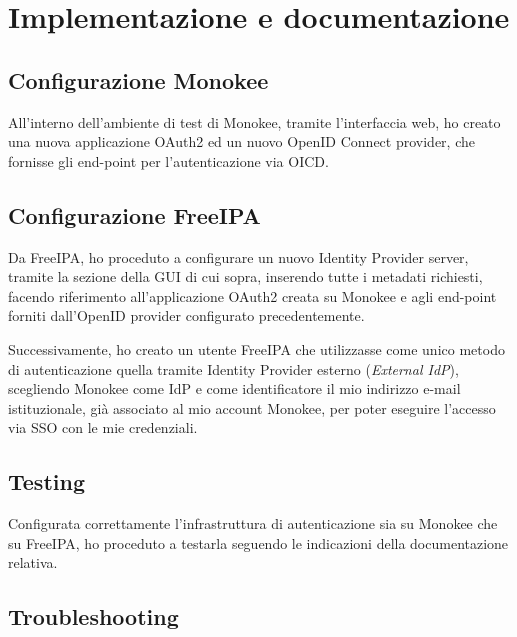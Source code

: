 
\chapter{Implementazione e documentazione}
\label{cap:implementazione-documentazione}



\section{Configurazione Monokee}
All'interno dell'ambiente di test di Monokee, tramite l'interfaccia web, ho creato una nuova applicazione OAuth2 ed un nuovo OpenID Connect provider, che fornisse gli end-point per l'autenticazione via OICD.


\section{Configurazione FreeIPA}
Da FreeIPA, ho proceduto a configurare un nuovo Identity Provider server, tramite la sezione della GUI di cui sopra, inserendo tutte i metadati richiesti, facendo riferimento all'applicazione OAuth2 creata su Monokee e agli end-point forniti dall'OpenID provider configurato precedentemente.

Successivamente, ho creato un utente FreeIPA che utilizzasse come unico metodo di autenticazione quella tramite Identity Provider esterno (\emph{External IdP}), scegliendo Monokee come IdP e come identificatore il mio indirizzo e-mail istituzionale, già associato al mio account Monokee, per poter eseguire l'accesso via SSO con le mie credenziali.  
\section{Testing}
Configurata correttamente l'infrastruttura di autenticazione sia su Monokee che su FreeIPA, ho proceduto a testarla seguendo le indicazioni della documentazione relativa.

\section{Troubleshooting}

